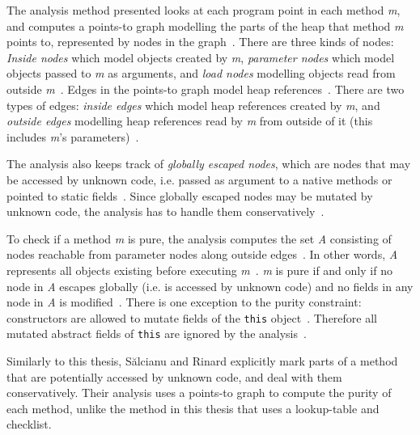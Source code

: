 \documentclass[a4paper,12pt]{article}
\begin{document}
The analysis method presented looks at each program point in each method \textit{m}, and computes a points-to graph modelling the parts of the heap that method \textit{m} points to, represented by nodes in the graph~\cite{salcianu}. There are three kinds of nodes: \textit{Inside nodes} which model objects created by \textit{m}, \textit{parameter nodes} which model objects passed to \textit{m} as arguments, and \textit{load nodes} modelling objects read from outside \textit{m}~\cite{salcianu}. Edges in the points-to graph model heap references~\cite{salcianu}. There are two types of edges: \textit{inside edges} which model heap references created by \textit{m}, and \textit{outside edges} modelling heap references read by \textit{m} from outside of it (this includes \textit{m}'s parameters)~\cite{salcianu}.


The analysis also keeps track of \textit{globally escaped nodes}, which are nodes that may be accessed by unknown code, i.e. passed as argument to a native methods or pointed to static fields~\cite{salcianu}. Since globally escaped nodes may be mutated by unknown code, the analysis has to handle them conservatively~\cite{salcianu}.

To check if a method \textit{m} is pure, the analysis computes the set \textit{A} consisting of nodes reachable from parameter nodes along outside edges~\cite{salcianu}. In other words, \textit{A} represents all objects existing before executing \textit{m}~\cite{salcianu}. \textit{m} is pure if and only if no node in \textit{A} escapes globally (i.e. is accessed by unknown code) and no fields in any node in \textit{A} is modified~\cite{salcianu}. There is one exception to the purity constraint: constructors are allowed to mutate fields of the \texttt{this} object~\cite{salcianu}. Therefore all mutated abstract fields of \texttt{this} are ignored by the analysis~\cite{salcianu}.

Similarly to this thesis, S\u{a}lcianu and Rinard explicitly mark parts of a method that are potentially accessed by unknown code, and deal with them conservatively. Their analysis uses a points-to graph to compute the purity of each method, unlike the method in this thesis that uses a lookup-table and checklist.

\end{document}
